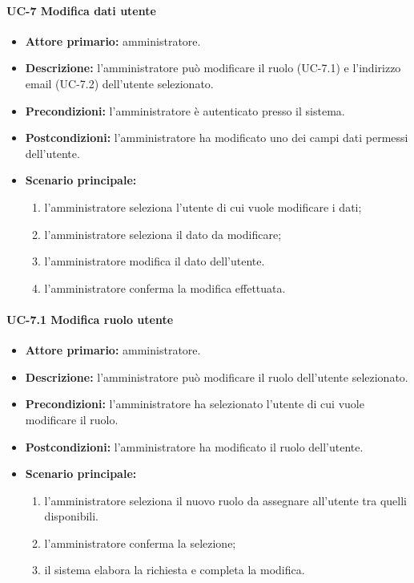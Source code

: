 \paragraph{UC-7 Modifica dati utente}
\begin{itemize}
	\item \textbf{Attore primario:} amministratore.

	\item \textbf{Descrizione:} l'amministratore può modificare il ruolo (UC-7.1) e l'indirizzo email (UC-7.2) dell'utente selezionato.
	
	\item \textbf{Precondizioni:} l'amministratore è autenticato presso il sistema.

	\item \textbf{Postcondizioni:} l'amministratore ha modificato uno dei campi dati permessi dell'utente.

	\item \textbf{Scenario principale:}
	\begin{enumerate}
    	\item  l'amministratore seleziona l'utente di cui vuole modificare i dati;
    	\item  l'amministratore seleziona il dato da modificare;
    	\item l'amministratore modifica il dato dell'utente.
    	\item l'amministratore conferma la modifica effettuata.
	\end{enumerate}
\end{itemize}
    
    \paragraph{UC-7.1 Modifica ruolo utente}
    \begin{itemize}
        \item \textbf{Attore primario:} amministratore.
    
        \item \textbf{Descrizione:} l'amministratore può modificare il ruolo dell'utente selezionato.
        
        \item \textbf{Precondizioni:} l'amministratore ha selezionato l'utente di cui vuole modificare il ruolo.
    
        \item \textbf{Postcondizioni:} l'amministratore ha modificato il ruolo dell'utente.
    
        \item \textbf{Scenario principale:}
        \begin{enumerate}
            \item  l'amministratore seleziona il nuovo ruolo da assegnare all'utente tra quelli disponibili.
            \item l'amministratore conferma la selezione;
            \item il sistema elabora la richiesta e completa la modifica.
        \end{enumerate}
    \end{itemize}
    

